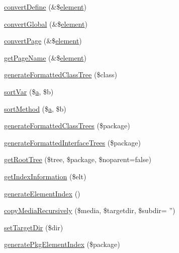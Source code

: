 \begin{DoxyCompactItemize}
\item 
\hyperlink{class_h_t_m_l_smarty_converter_a9f23827e97c2672a94ff615d9bb00601}{convert\-Define} (\&\$\hyperlink{bug-904820_8php_aa94081298ab2dfd0f261cce6c203d9aa}{element})
\item 
\hyperlink{class_h_t_m_l_smarty_converter_a1d1bb2b092be87ba7a40b0064ac43b6c}{convert\-Global} (\&\$\hyperlink{bug-904820_8php_aa94081298ab2dfd0f261cce6c203d9aa}{element})
\item 
\hyperlink{class_h_t_m_l_smarty_converter_a48d30cbead70c887449fda723aa0bb6e}{convert\-Page} (\&\$\hyperlink{bug-904820_8php_aa94081298ab2dfd0f261cce6c203d9aa}{element})
\item 
\hyperlink{class_h_t_m_l_smarty_converter_ad39e717881e42150610bbed94471f8bf}{get\-Page\-Name} (\&\$\hyperlink{bug-904820_8php_aa94081298ab2dfd0f261cce6c203d9aa}{element})
\item 
\hyperlink{class_h_t_m_l_smarty_converter_a694db0f7353906320d85ee37bd7e2fc5}{generate\-Formatted\-Class\-Tree} (\$class)
\item 
\hyperlink{class_h_t_m_l_smarty_converter_a289e8b5fc5ba77255d344e7d24ac64a5}{sort\-Var} (\$\hyperlink{classa}{a}, \$b)
\item 
\hyperlink{class_h_t_m_l_smarty_converter_ac169dd8b41da10e16c21f4e6685ee3af}{sort\-Method} (\$\hyperlink{classa}{a}, \$b)
\item 
\hyperlink{class_h_t_m_l_smarty_converter_ac4ce6d55dd5c5683966b882dcc6809e0}{generate\-Formatted\-Class\-Trees} (\$package)
\item 
\hyperlink{class_h_t_m_l_smarty_converter_a0950322f71c6ac513f10e25f12aefcf0}{generate\-Formatted\-Interface\-Trees} (\$package)
\item 
\hyperlink{class_h_t_m_l_smarty_converter_a28800b40ee0b082b3e6bf82844c2037c}{get\-Root\-Tree} (\$tree, \$package, \$noparent=false)
\item 
\hyperlink{class_h_t_m_l_smarty_converter_afe3edf57e42768ce6a310e1004aef16b}{get\-Index\-Information} (\$elt)
\item 
\hyperlink{class_h_t_m_l_smarty_converter_a2b514cc775614890edad823f189b2655}{generate\-Element\-Index} ()
\item 
\hyperlink{class_h_t_m_l_smarty_converter_ac7d72a781ca48beca5f279582f7e37b1}{copy\-Media\-Recursively} (\$media, \$targetdir, \$subdir= '')
\item 
\hyperlink{class_h_t_m_l_smarty_converter_a07611111094b2954729773f6436a0fe1}{set\-Target\-Dir} (\$dir)
\item 
\hyperlink{class_h_t_m_l_smarty_converter_ad067ad187db8d433a5de042050c63ada}{generate\-Pkg\-Element\-Index} (\$package)

\end{DoxyCompactItemize}
